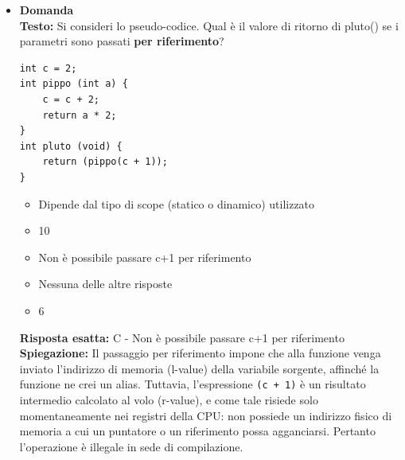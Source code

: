 \documentclass[12pt, a4paper]{article}
\newcounter{domandateoria}
\begin{document}
\begin{itemize}
    \item {}\textbf{Domanda \thedomandateoria} \\
    \textbf{Testo:} Si consideri lo pseudo-codice. Qual è il valore di ritorno di pluto() se i parametri sono passati \textbf{per riferimento}?
\begin{verbatim}
int c = 2;
int pippo (int a) {
    c = c + 2;
    return a * 2;
}
int pluto (void) {
    return (pippo(c + 1));
}
\end{verbatim}
    \begin{itemize}
        \item[A)] Dipende dal tipo di scope (statico o dinamico) utilizzato
        \item[B)] 10
        \item[C)] Non è possibile passare c+1 per riferimento
        \item[D)] Nessuna delle altre risposte
        \item[E)] 6
    \end{itemize}
    \textbf{Risposta esatta:} C - Non è possibile passare c+1 per riferimento \\
    \textbf{Spiegazione:} Il passaggio per riferimento impone che alla funzione venga inviato l'indirizzo di memoria (l-value) della variabile sorgente, affinché la funzione ne crei un alias. Tuttavia, l'espressione \texttt{(c + 1)} è un risultato intermedio calcolato al volo (r-value), e come tale risiede solo momentaneamente nei registri della CPU: non possiede un indirizzo fisico di memoria a cui un puntatore o un riferimento possa agganciarsi. Pertanto l'operazione è illegale in sede di compilazione.
    \vspace{0.3cm}


\end{itemize}
\end{document}

